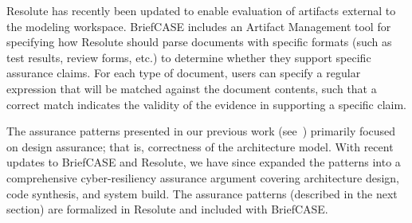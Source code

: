 Resolute has recently been updated to enable evaluation of artifacts external to the modeling workspace. BriefCASE includes an Artifact Management tool for specifying how Resolute should parse documents with specific formats (such as test results, review forms, etc.) to determine whether they support specific assurance claims.  For each type of document, users can specify a regular expression that will be matched against the document contents, such that a correct match indicates the validity of the evidence in supporting a specific claim.

The assurance patterns presented in our previous work (see~\cite{resolute-destion}) primarily focused on design assurance; that is, correctness of the architecture model.  With recent updates to BriefCASE and Resolute, we have since expanded the patterns into a comprehensive cyber-resiliency assurance argument covering architecture design, code synthesis, and system build.  The assurance patterns (described in the next section) are formalized in Resolute and included with BriefCASE.
